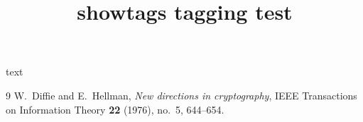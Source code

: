 \documentclass{article}
\title{showtags tagging test}
\begin{document}
text

\begin{thebibliography}{9}
W.~Diffie and E.~Hellman, \emph{New directions in cryptography}, IEEE
Transactions on Information Theory \textbf{22} (1976), no.~5, 644--654.
\end{thebibliography}
\end{document}
